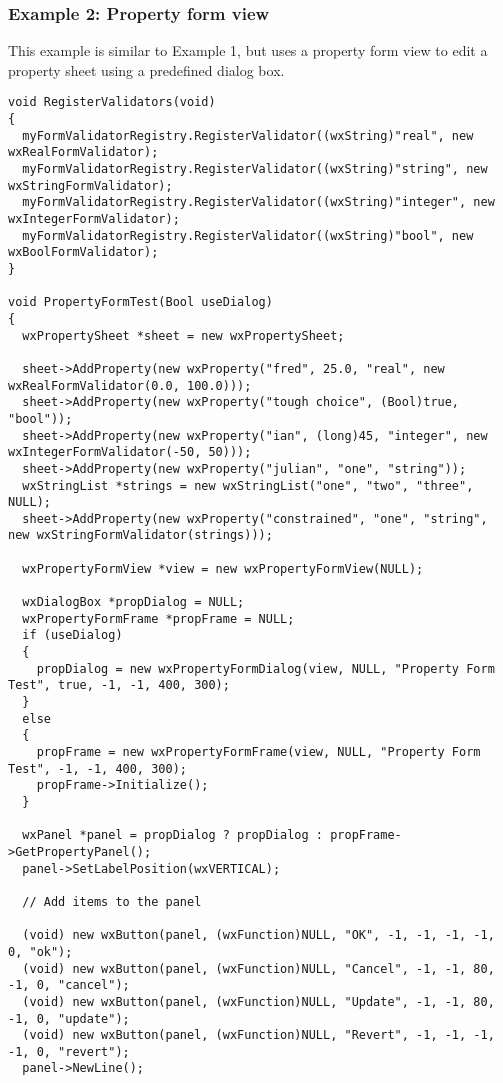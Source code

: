 \subsubsection{Example 2: Property form view}

This example is similar to Example 1, but uses a property form view to
edit a property sheet using a predefined dialog box.

\begin{verbatim}
void RegisterValidators(void)
{
  myFormValidatorRegistry.RegisterValidator((wxString)"real", new wxRealFormValidator);
  myFormValidatorRegistry.RegisterValidator((wxString)"string", new wxStringFormValidator);
  myFormValidatorRegistry.RegisterValidator((wxString)"integer", new wxIntegerFormValidator);
  myFormValidatorRegistry.RegisterValidator((wxString)"bool", new wxBoolFormValidator);
}

void PropertyFormTest(Bool useDialog)
{
  wxPropertySheet *sheet = new wxPropertySheet;

  sheet->AddProperty(new wxProperty("fred", 25.0, "real", new wxRealFormValidator(0.0, 100.0)));
  sheet->AddProperty(new wxProperty("tough choice", (Bool)true, "bool"));
  sheet->AddProperty(new wxProperty("ian", (long)45, "integer", new wxIntegerFormValidator(-50, 50)));
  sheet->AddProperty(new wxProperty("julian", "one", "string"));
  wxStringList *strings = new wxStringList("one", "two", "three", NULL);
  sheet->AddProperty(new wxProperty("constrained", "one", "string", new wxStringFormValidator(strings)));

  wxPropertyFormView *view = new wxPropertyFormView(NULL);

  wxDialogBox *propDialog = NULL;
  wxPropertyFormFrame *propFrame = NULL;
  if (useDialog)
  {
    propDialog = new wxPropertyFormDialog(view, NULL, "Property Form Test", true, -1, -1, 400, 300);
  }
  else
  {
    propFrame = new wxPropertyFormFrame(view, NULL, "Property Form Test", -1, -1, 400, 300);
    propFrame->Initialize();
  }
  
  wxPanel *panel = propDialog ? propDialog : propFrame->GetPropertyPanel();
  panel->SetLabelPosition(wxVERTICAL);
  
  // Add items to the panel
  
  (void) new wxButton(panel, (wxFunction)NULL, "OK", -1, -1, -1, -1, 0, "ok");
  (void) new wxButton(panel, (wxFunction)NULL, "Cancel", -1, -1, 80, -1, 0, "cancel");
  (void) new wxButton(panel, (wxFunction)NULL, "Update", -1, -1, 80, -1, 0, "update");
  (void) new wxButton(panel, (wxFunction)NULL, "Revert", -1, -1, -1, -1, 0, "revert");
  panel->NewLine();
  

\end{verbatim}
